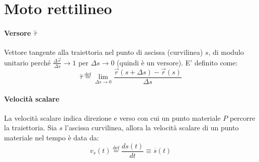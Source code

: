 	\section{Moto rettilineo}

\paragraph{Versore $\hat \tau$}
 Vettore tangente alla traiettoria nel punto di ascissa (curvilinea) $s$, di modulo unitario 
perché $\frac{\Delta \overset{\to}{r}}{\Delta s} \to 1$ per $\Delta s \to 0$ (quindi è un versore).
E' definito come: \begin{equation} 
	\hat \tau \overset{\text {def}}{=}\lim _{\Delta s\to 0}\frac{\overset{\to}{r}(s+\Delta s)-\overset{\to}{r}(s)}{\Delta s}
\end{equation}




\paragraph{Velocità scalare} 
La velocità scalare indica direzione e verso con cui un punto materiale $P$ percorre la traiettoria. 
Sia $s$ l'ascissa curvilinea, allora la velocità scalare di un punto materiale nel tempo è data da: 
\begin{equation}
	v_s(t)\overset{\text {def}}{=}\frac{ds(t)}{dt}\equiv \overset{\cdot}{s}(t)
\end{equation}


 
